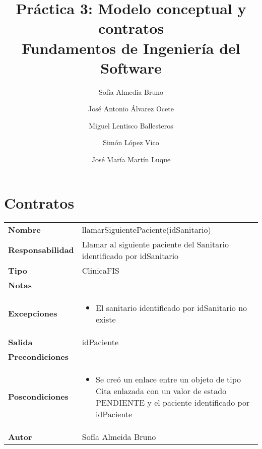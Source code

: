 \documentclass[11pt,a4paper]{article}
\title{Práctica 3: Modelo conceptual y contratos \large\\ Fundamentos de Ingeniería del Software}
\author{Sofía Almedia Bruno \and José Antonio Álvarez Ocete \and Miguel Lentisco Ballesteros \and Simón López Vico \and José María Martín Luque}
\newenvironment{itemizenomargins}
    {\begin{minipage}[t]{1\linewidth}\begin{itemize}}
    {\end{itemize}\end{minipage}}
\begin{document}
\maketitle

\section{Contratos}

\begin{table}[H]
\centering
\label{my-label}
\begin{tabularx}{\textwidth}{l|X}
\textbf{Nombre}          & llamarSiguientePaciente(idSanitario) \\
\textbf{Responsabilidad} & Llamar al siguiente paciente del Sanitario identificado por idSanitario \\
\textbf{Tipo}            & ClinicaFIS \\
\textbf{Notas}           &  \\
\textbf{Excepciones}     & 
\begin{itemizenomargins}
\item El sanitario identificado por idSanitario no existe
\end{itemizenomargins}\\
\textbf{Salida}          & idPaciente \\
\textbf{Precondiciones}  &  \\
\textbf{Poscondiciones}  &
\begin{itemizenomargins}
\item Se creó un enlace entre un objeto de tipo Cita enlazada con un valor de estado PENDIENTE y el paciente identificado por idPaciente 
\end{itemizenomargins}\\
\textbf{Autor} & Sofía Almeida Bruno\\
\end{tabularx}
\end{table}
\end{document}

